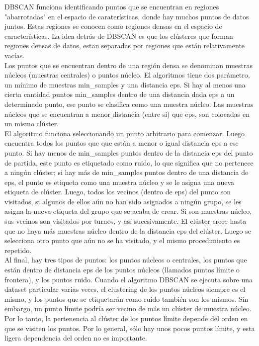 DBSCAN funciona identificando puntos que se encuentran en regiones "{}abarrotadas{}"  {} en el 
espacio de caraterísticas, donde hay muchos puntos de datos  juntos. Estas regiones se conocen como
regiones densas en el espacio de características. La idea detrás de DBSCAN es que los clústeres que forman regiones densas de datos, estan  separadas por regiones que están relativamente vacías. \\
 
 Los puntos que se encuentran dentro de una región densa se denominan muestras  núcleos (muestras centrales) o puntos  núcleo.    El algoritmos tiene dos parámetro, un mínimo de muestras  {\ttfamily min\_samples}  y  una distancia  {\ttfamily eps}. Si  hay  al  menos  una cierta cantidad  puntos {\ttfamily min\_samples}   dentro de una distancia dada {\ttfamily eps} a un determinado  punto, ese punto  se clasifica como una muestra núcleo.     
Las muestras núcleos que se encuentran a menor distancia (entre sí) que  {\ttfamily eps}, son colocadas  en un  mismo clúster. \\

 El   algoritmo funciona seleccionando un punto arbitrario para comenzar. Luego encuentra todos los puntos que que están a menor o igual distancia {\ttfamily eps}   a ese punto. Si hay menos de  {\ttfamily min\_samples} puntos dentro de la distancia {\ttfamily eps}  del punto de partida, este punto es etiquetado como ruido, lo que significa que no pertenece a ningún clúster; si hay más de {\ttfamily min\_samples} puntos dentro  de una distancia de  {\ttfamily eps}, el punto es etiqueta como una muestra núcleo y se le asigna una nueva etiqueta de clúster. Luego,  todos los vecinos (dentro de  {\ttfamily eps}) del punto son visitados, si algunos de ellos  aún no han sido asignados a ningún grupo, se les asigna la nueva etiqueta del grupo que se acaba de crear. Si son muestras núcleo, sus vecinos son visitados por turnos, y así sucesivamente.  El  clúster  crece hasta que no haya más muestras  núcleo dentro de la distancia  {\ttfamily eps} del clúster. Luego se selecciona otro punto que aún no se ha visitado, y el mismo procedimiento es  repetido.\\



Al final, hay tres tipos de puntos: los puntos núcleos o centrales, los puntos que están dentro de distancia  {\ttfamily eps}   de los puntos núcleos (llamados puntos  límite o frontera), y los puntos ruido.     Cuando el algoritmo DBSCAN se ejecuta sobre una dataset particular varias veces, el clustering  de los puntos núcleos  siempre es el mismo, y los puntos que se etiquetarán como ruido también son los mismos. Sin embargo, un punto  límite  podría ser vecino de más  un clúster de muestra  núcleo.  Por lo tanto, la pertenencia al clúster de los puntos límite depende del orden en que se visiten los puntos.  Por lo general, sólo hay unos pocos puntos límite, y esta ligera dependencia del  orden no es importante.\\


